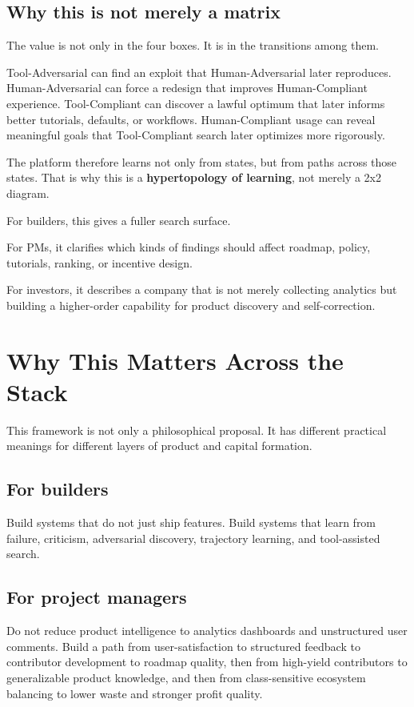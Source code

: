 \documentclass[11pt]{article}
\begin{document}
\subsection{Why this is not merely a matrix}

The value is not only in the four boxes. It is in the transitions among them.

Tool-Adversarial can find an exploit that Human-Adversarial later reproduces. Human-Adversarial can force a redesign that improves Human-Compliant experience. Tool-Compliant can discover a lawful optimum that later informs better tutorials, defaults, or workflows. Human-Compliant usage can reveal meaningful goals that Tool-Compliant search later optimizes more rigorously.

The platform therefore learns not only from states, but from paths across those states. That is why this is a \textbf{hypertopology of learning}, not merely a 2x2 diagram.

For builders, this gives a fuller search surface.

For PMs, it clarifies which kinds of findings should affect roadmap, policy, tutorials, ranking, or incentive design.

For investors, it describes a company that is not merely collecting analytics but building a higher-order capability for product discovery and self-correction.

\section{Why This Matters Across the Stack}

This framework is not only a philosophical proposal. It has different practical meanings for different layers of product and capital formation.

\subsection{For builders}

Build systems that do not just ship features. Build systems that learn from failure, criticism, adversarial discovery, trajectory learning, and tool-assisted search.

\subsection{For project managers}

Do not reduce product intelligence to analytics dashboards and unstructured user comments. Build a path from user-satisfaction to structured feedback to contributor development to roadmap quality, then from high-yield contributors to generalizable product knowledge, and then from class-sensitive ecosystem balancing to lower waste and stronger profit quality.
\end{document}
